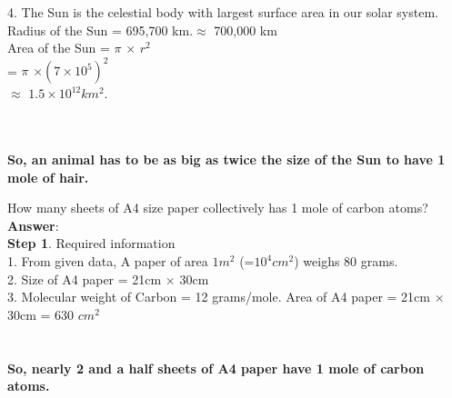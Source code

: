 \documentclass[11pt]{exam}
\begin{document}
\begin{questions}
{\begin{minipage}{42em}
                          4. The Sun is the celestial body with largest surface area in our 
                             solar system.\\ Radius of the Sun = 695,700 km.$\approx$ 700,000 
                             km \\
                             Area of the Sun = $\pi$ $\times$ $r^{2}$ \\
                                             = $\pi$ $\times(7\times10^{5})^{2}$   \\
                                             $\approx$ $1.5\times10^{12}km^{2}$. 
\end{minipage}}\\  \\
         \textbf{So, an animal has to be as big as twice the size of the Sun to have 1 mole of hair.} \\                  


\question
\label{Q4:A4 paper}

How many sheets of A4 size paper collectively has 1 mole of carbon atoms?\\
\textbf{Answer}: \\ 
\textbf{Step 1}. Required information\\ 
1. From given data, A paper of area $1m^{2}$ (=$10^{4}cm^{2}$) weighs 80 grams. \\ 
2. Size of A4 paper = 21cm $\times$ 30cm \\ 
3. Molecular weight of Carbon = 12 grams/mole.
 Area of A4 paper = 21cm $\times$ 30cm = 630 $cm^{2}$\\ 

 \\ \\
\textbf{So, nearly 2 and a half sheets of A4 paper have 1 mole of carbon atoms.} \\ \\


\end{questions}
\end{document}

